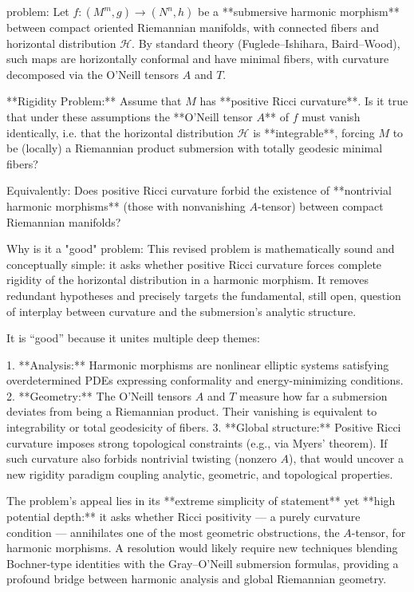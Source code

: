 problem:  
Let \(f: (M^m, g) \to (N^n, h)\) be a **submersive harmonic morphism** between compact oriented Riemannian manifolds, with connected fibers and horizontal distribution \(\mathcal{H}\).  
By standard theory (Fuglede–Ishihara, Baird–Wood), such maps are horizontally conformal and have minimal fibers, with curvature decomposed via the O’Neill tensors \(A\) and \(T\).  

**Rigidity Problem:**  
Assume that \(M\) has **positive Ricci curvature**.  
Is it true that under these assumptions the **O’Neill tensor \(A\)** of \(f\) must vanish identically, i.e. that the horizontal distribution \(\mathcal{H}\) is **integrable**, forcing \(M\) to be (locally) a Riemannian product submersion with totally geodesic minimal fibers?  

Equivalently:  
Does positive Ricci curvature forbid the existence of **nontrivial harmonic morphisms** (those with nonvanishing \(A\)-tensor) between compact Riemannian manifolds?  

Why is it a "good" problem:  
This revised problem is mathematically sound and conceptually simple: it asks whether positive Ricci curvature forces complete rigidity of the horizontal distribution in a harmonic morphism. It removes redundant hypotheses and precisely targets the fundamental, still open, question of interplay between curvature and the submersion’s analytic structure.  

It is “good” because it unites multiple deep themes:  

1. **Analysis:** Harmonic morphisms are nonlinear elliptic systems satisfying overdetermined PDEs expressing conformality and energy-minimizing conditions.  
2. **Geometry:** The O’Neill tensors \(A\) and \(T\) measure how far a submersion deviates from being a Riemannian product. Their vanishing is equivalent to integrability or total geodesicity of fibers.  
3. **Global structure:** Positive Ricci curvature imposes strong topological constraints (e.g., via Myers’ theorem). If such curvature also forbids nontrivial twisting (nonzero \(A\)), that would uncover a new rigidity paradigm coupling analytic, geometric, and topological properties.  

The problem’s appeal lies in its **extreme simplicity of statement** yet **high potential depth:** it asks whether Ricci positivity — a purely curvature condition — annihilates one of the most geometric obstructions, the \(A\)-tensor, for harmonic morphisms. A resolution would likely require new techniques blending Bochner-type identities with the Gray–O’Neill submersion formulas, providing a profound bridge between harmonic analysis and global Riemannian geometry.